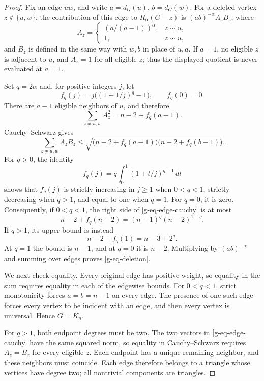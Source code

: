 \documentclass[11pt,a4paper]{article}
\theoremstyle{definition}
\theoremstyle{remark}
\begin{document}
\begin{proof}
Fix an edge $uw$, and write $a=d_G(u)$, $b=d_G(w)$.  For a deleted vertex
$z\notin\{u,w\}$, the contribution of this edge to $R_\alpha(G-z)$ is
$(ab)^{-\alpha}A_zB_z$, where
\[
 A_z=
 \begin{cases}
 (a/(a-1))^\alpha,&z\sim u,\\
 1,&z\not\sim u,
 \end{cases}
\]
and $B_z$ is defined in the same way with $w,b$ in place of $u,a$.
If $a=1$, no eligible $z$ is adjacent to $u$, and $A_z=1$ for all eligible
$z$; thus the displayed quotient is never evaluated at $a=1$.

Set $q=2\alpha$ and, for positive integers $j$, let
\[
 f_q(j)=j\bigl((1+1/j)^q-1\bigr),\qquad f_q(0)=0.
\]
There are $a-1$ eligible neighbors of $u$, and therefore
\[
 \sum_{z\ne u,w}A_z^2=n-2+f_q(a-1).
\]
Cauchy--Schwarz gives
\begin{equation}
 \sum_{z\ne u,w}A_zB_z
 \le\sqrt{\bigl(n-2+f_q(a-1)\bigr)
              \bigl(n-2+f_q(b-1)\bigr)}.
 \label{g-eq-edge-cauchy}
\end{equation}
For $q>0$, the identity
\[
 f_q(j)=q\int_0^1(1+t/j)^{q-1}\,dt
\]
shows that $f_q(j)$ is strictly increasing in $j\ge1$ when $0<q<1$,
strictly decreasing when $q>1$, and equal to one when $q=1$.
For $q=0$, it is zero.  Consequently, if $0<q<1$, the right side of
\eqref{g-eq-edge-cauchy} is at most
\[
 n-2+f_q(n-2)=(n-1)^q(n-2)^{1-q}.
\]
If $q>1$, its upper bound is instead
\[
 n-2+f_q(1)=n-3+2^q.
\]
At $q=1$ the bound is $n-1$, and at $q=0$ it is $n-2$.
Multiplying by $(ab)^{-\alpha}$ and summing over edges proves
\eqref{g-eq-deletion}.

We next check equality.  Every original edge has positive weight, so equality
in the sum requires equality in each of the edgewise bounds.  For $0<q<1$,
strict monotonicity forces $a=b=n-1$ on every edge.  The presence of one
such edge forces every vertex to be incident with an edge, and then every
vertex is universal.  Hence $G=K_n$.

For $q>1$, both endpoint degrees must be two.  The two vectors in
\eqref{g-eq-edge-cauchy} have the same squared norm, so equality in
Cauchy--Schwarz requires $A_z=B_z$ for every eligible $z$.  Each endpoint
has a unique remaining neighbor, and these neighbors must coincide.  Each
edge therefore belongs to a triangle whose vertices have degree two; all
nontrivial components are triangles.


\end{proof}
\end{document}
